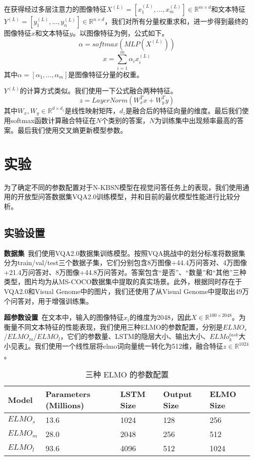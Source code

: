 在获得经过多层注意力的图像特征$X^{(L)}=[x^{(L)}_1,...,x^{(L)}_m]\in\mathbb{R}^{m \times d}$和文本特征$Y^{(L)}=[y^{(L)}_1,...,y^{(L)}_n]\in\mathbb{R}^{n \times d}$，我们对所有分量权重求和，进一步得到最终的图像特征$x$和文本特征$y$。以图像特征为例，公式如下。
\begin{equation}
\alpha = softmax(MLP(X^{(L)}))
\end{equation}
\begin{equation}
x = \sum_{i=1}^m \alpha_i x_i^{(L)}
\end{equation}
其中$\alpha = [\alpha_1,...,\alpha_m]$是图像特征分量的权重。

$Y^{(L)}$的计算方式类似。我们使用一下公式融合两种特征。
\begin{equation}
z = LayerNorm(W_x^Tx + W_y^Ty)
\end{equation}
其中$W_x, W_y \in \mathbb{R}^{d \times d_z}$是线性映射矩阵，$d_z$是融合后的特征向量的维度。最后我们使用softmax函数计算融合特征在$N$个类别的答案，$N$为训练集中出现频率最高的答案。最后我们使用交叉熵更新模型参数。

\section{实验}
为了确定不同的参数配置对于N-KBSN模型在视觉问答任务上的表现，我们使用通用的开放型问答数据集VQA2.0训练模型，并和目前的最优模型性能进行比较分析。

\subsection{实验设置}
\textbf{数据集}\ 我们使用VQA2.0数据集训练模型。按照VQA挑战中的划分标准将数据集分为train/val/test三个数据子集，它们分别包含8万图像+44.4万问答对、4万图像+21.4万问答对、8万图像+44.8万问答对。答案包含“是否”、“数量”和“其他”三种类型，图片均为从MS-COCO数据集中提取的真实场景。此外，根据同时存在于VQA2.0和Visual Genome中的图片，我们还使用了从Visual Genome中提取出49万个问答对，用于增强训练集。

\textbf{超参数设置}\ 在文本中，输入的图像特征$x_i$的维度为2048，因此$X \in \mathbb{R}^{100 \times 2048}$。为衡量不同文本特征的性能表现，我们使用三种ELMO的参数配置，分别是$ELMO_s$/$ELMO_m$/$ELMO_l$，它们的参数量、LSTM的隐层大小、输出大小、$ELMo_k^{task}$大小见表\ref{ELMO_models}。我们使用一个线性层将elmo词向量统一转化为512维，融合特征$z \in \mathbb{R}^{1024}$。
\begin{table}[H]
\centering
\caption{三种 ELMO 的参数配置}
\begin{tabular*}{0.9\textwidth}{lp{2.5cm}p{2.5cm}p{2.5cm}p{2.5cm}}
\toprule
\textbf{Model} & \textbf{Parameters (Millions)} & \textbf{LSTM Size} & \textbf{Output Size} & \textbf{ELMO Size}\\
\midrule
$ELMO_s$&  13.6& 1024&  128& 256\\
$ELMO_m$&  28.0& 2048&  256& 512\\
$ELMO_l$&  93.6& 4096&  512& 1024\\
\bottomrule
\end{tabular*}
\label{ELMO_models}
\end{table}

